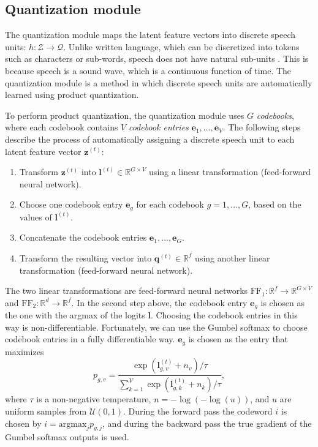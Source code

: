 \subsection{Quantization module}
The quantization module maps the latent feature vectors into discrete speech units: $h: \mathcal{Z} \rightarrow \mathcal{Q}$.
Unlike written language, which can be discretized into tokens such as characters or sub-words, speech does not have natural sub-units \cite{bgn2021illustrated}.
This is because speech is a sound wave, which is a continuous function of time.
The quantization module is a method in which discrete speech units are automatically learned using product quantization.

To perform product quantization, the quantization module uses $G$ \emph{codebooks}, where each codebook contains $V$ \emph{codebook entries} $\mathbf{e}_{1}, \dots, \mathbf{e}_{V}$.
The following steps describe the process of automatically assigning a discrete speech unit to each latent feature vector $\mathbf{z}^{(t)}$:
\begin{enumerate}
    \item Transform $\mathbf{z}^{(t)}$ into $\mathbf{l}^{(t)} \in \mathbb{R}^{G \times V}$ using a linear transformation (feed-forward neural network).
    \item Choose one codebook entry $\mathbf{e}_g$ for each codebook $g = 1, \dots, G$, based on the values of $\mathbf{l}^{(t)}$.
    \item Concatenate the codebook entries $\mathbf{e}_1, \dots, \mathbf{e}_G$.
    \item Transform the resulting vector into $\mathbf{q}^{(t)} \in \mathbb{R}^{f}$ using another linear transformation (feed-forward neural network).
\end{enumerate}
The two linear transformations are feed-forward neural networks $\text{FF}_1: \mathbb{R}^{f} \rightarrow \mathbb{R}^{G \times V}$ and $\text{FF}_2: \mathbb{R}^{d} \rightarrow \mathbb{R}^{f}$.
In the second step above, the codebook entry $\mathbf{e}_g$ is chosen as the one with the argmax of the logits $\mathbf{l}$. Choosing the codebook entries in this way is non-differentiable.
Fortunately, we can use the Gumbel softmax to choose codebook entries in a fully differentiable way. 
$\mathbf{e}_g$ is chosen as the entry that maximizes
\begin{equation}
    p_{g, v} = \dfrac{\exp{\left(\mathbf{l}^{(t)}_{g, v} + n_v\right)}/\tau}{\sum\limits_{k=1}^{V} \exp{\left(\mathbf{l}^{(t)}_{g, k} + n_k\right)}/\tau},
\end{equation}
where $\tau$ is a non-negative temperature, $n = -\log{(-\log{(u)})}$, and $u$ are uniform samples from $\mathcal{U}(0, 1)$.
During the forward pass the codeword $i$ is chosen by $i = \text{argmax}_j p_{g,j}$, and during the backward pass the true gradient of the Gumbel softmax outputs is used.

